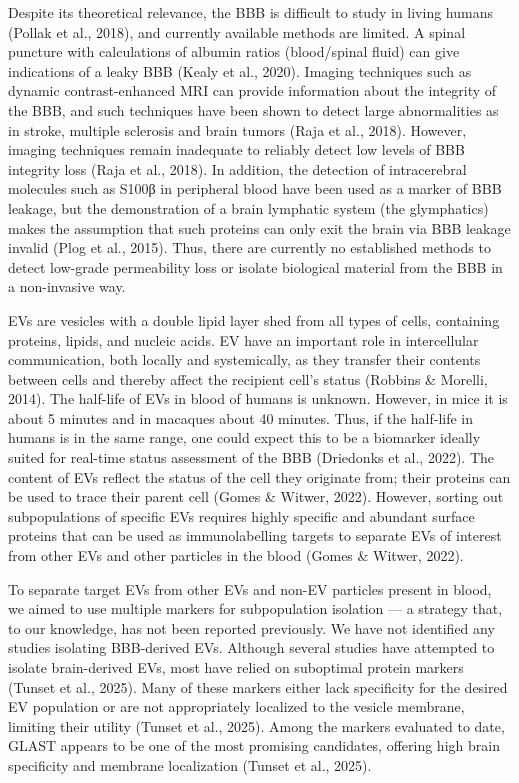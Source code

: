 \documentclass[authordate, empirical]{jote-new-article}
\begin{document}
	Despite its theoretical relevance, the BBB is difficult to study in living humans (Pollak et al., 2018), and currently available methods are limited. A spinal puncture with calculations of albumin ratios (blood/spinal fluid) can give indications of a leaky BBB (Kealy et al., 2020). Imaging techniques such as dynamic contrast-enhanced MRI can provide information about the integrity of the BBB, and such techniques have been shown to detect large abnormalities as in stroke, multiple sclerosis and brain tumors (Raja et al., 2018). However, imaging techniques remain inadequate to reliably detect low levels of BBB integrity loss (Raja et al., 2018). In addition, the detection of intracerebral molecules such as S100β in peripheral blood have been used as a marker of BBB leakage, but the demonstration of a brain lymphatic system (the glymphatics) makes the assumption that such proteins can only exit the brain via BBB leakage invalid (Plog et al., 2015). Thus, there are currently no established methods to detect low-grade permeability loss or isolate biological material from the BBB in a non-invasive way.



	EVs are vesicles with a double lipid layer shed from all types of cells, containing proteins, lipids, and nucleic acids. EV have an important role in intercellular communication, both locally and systemically, as they transfer their contents between cells and thereby affect the recipient cell's status (Robbins \& Morelli, 2014). The half-life of EVs in blood of humans is unknown. However, in mice it is about 5 minutes and in macaques about 40 minutes. Thus, if the half-life in humans is in the same range, one could expect this to be a biomarker ideally suited for real-time status assessment of the BBB (Driedonks et al., 2022). The content of EVs reflect the status of the cell they originate from; their proteins can be used to trace their parent cell (Gomes \& Witwer, 2022). However, sorting out subpopulations of specific EVs requires highly specific and abundant surface proteins that can be used as immunolabelling targets to separate EVs of interest from other EVs and other particles in the blood (Gomes \& Witwer, 2022).



	To separate target EVs from other EVs and non-EV particles present in blood, we aimed to use multiple markers for subpopulation isolation — a strategy that, to our knowledge, has not been reported previously. We have not identified any studies isolating BBB-derived EVs. Although several studies have attempted to isolate brain-derived EVs, most have relied on suboptimal protein markers (Tunset et al., 2025). Many of these markers either lack specificity for the desired EV population or are not appropriately localized to the vesicle membrane, limiting their utility (Tunset et al., 2025). Among the markers evaluated to date, GLAST appears to be one of the most promising candidates, offering high brain specificity and membrane localization (Tunset et al., 2025).
\end{document}
